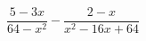 \begin{ex}[type=expression]
	\begin{condition}
		\(\dfrac{5-3x}{64-x^2}-\dfrac{2-x}{x^2-16x+64}\)
	\end{condition}
\end{ex}